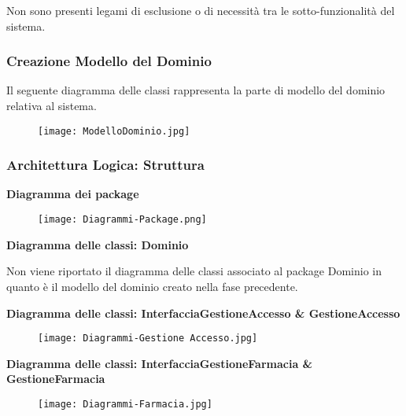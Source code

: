 Non sono presenti legami di esclusione o di necessità tra le sotto-funzionalità del sistema. 

\newpage
\subsubsection{Creazione Modello del Dominio}

Il seguente diagramma delle classi rappresenta la parte di modello del dominio relativa al sistema. \\

\begin{figure}[h!]
    \begin{center}
        \texttt{[image: ModelloDominio.jpg]}
    \end{center}
\end{figure}
\hfill \break

\newpage
\subsubsection{Architettura Logica: Struttura}
\hfill \break

\textbf{Diagramma dei package}
\hfill \break

\begin{figure}[h!]
    \begin{center}
        \texttt{[image: Diagrammi-Package.png]}
    \end{center}
\end{figure}
\hfill \break

\textbf{Diagramma delle classi: Dominio}
\hfill \break

Non viene riportato il diagramma delle classi associato al package Dominio in quanto è il modello del dominio creato nella fase precedente.  

\newpage

\textbf{Diagramma delle classi: InterfacciaGestioneAccesso \& GestioneAccesso}
\hfill \break

\begin{figure}[h!]
    \begin{center}
        \texttt{[image: Diagrammi-Gestione Accesso.jpg]}
    \end{center}
\end{figure}
\hfill \break

\textbf{Diagramma delle classi: InterfacciaGestioneFarmacia \& GestioneFarmacia}
\hfill \break

\begin{figure}[h!]
    \begin{center}
        \texttt{[image: Diagrammi-Farmacia.jpg]}
    \end{center}
\end{figure}
\hfill \break

